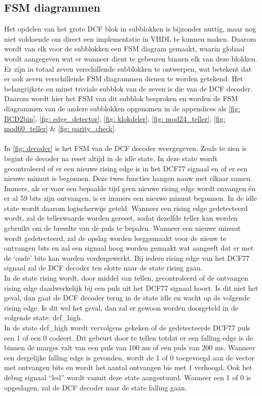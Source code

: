 \documentclass[a4paper, twoside, 10pt]{article}
\begin{document}
\subsection{FSM diagrammen}
Het opdelen van het grote DCF blok in subblokken is bijzonder nuttig, maar nog niet voldoende om direct een implementatie in VHDL te kunnen maken. Daarom wordt van elk voor de subblokken een FSM diagram gemaakt, waarin globaal wordt aangegeven wat er wanneer dient te gebeuren binnen elk van deze blokken. Er zijn in totaal zeven verschillende subblokken te ontwerpen, wat betekent dat er ook zeven verschillende FSM diagrammen dienen te worden getekend. Het belangrijkste en minst triviale subblok van de zeven is die van de DCF decoder. Daarom wordt hier het FSM van dit subblok besproken en worden de FSM diagrammen van de andere subblokken opgenomen in de appendices als \cref{fig: BCD2bin}, \cref{fig: edge_detector}, \cref{fig: klokdeler}, \cref{fig: mod24_teller}, \cref{fig: mod60_teller} \& \cref{fig: parity_check}.\\\\
\noindent In \cref{fig: decoder} is het FSM van de DCF decoder weergegeven. Zoals te zien is begint de decoder na reset altijd in de idle state. In deze state wordt gecontroleerd of er een nieuwe rising edge is in het DCF77 signaal en of er een nieuwe minuut is begonnen. Deze twee functies hangen nauw met elkaar samen. Immers, als er voor een bepaalde tijd geen nieuwe rising edge wordt onvangen \'en er al 59 bits zijn ontvangen, is er immers een nieuwe minuut begonnen. In de idle state wordt daarom logischerwijs geteld. Wanneer een rising edge gedetecteerd wordt, zal de tellerwaarde worden gereset, zodat dezelfde teller kan worden gebruikt om de breedte van de puls te bepalen. Wanneer een nieuwe minuut wordt gedetecteerd, zal de opslag worden leeggemaakt voor de nieuw te ontvangen bits en zal een signaal hoog worden gemaakt wat aangeeft dat er met de `oude' bits kan worden verdergewerkt. Bij iedere rising edge van het DCF77 signaal zal de DCF decoder ten slotte naar de state rising gaan.\\
\noindent In de state rising wordt, door middel van tellen, gecontroleerd of de ontvangen rising edge daadwerkelijk bij een puls uit het DCF77 signaal hoort. Is dit niet het geval, dan gaat de DCF decoder terug in de state idle en wacht op de volgende rising edge. Is dit wel het geval, dan zal er gewoon worden doorgeteld in de volgende state: dcf\_high.\\
\noindent In de state dcf\_high wordt vervolgens gekeken of de gedetecteerde DCF77 puls een 1 of een 0 codeert. Dit gebeurt door te tellen totdat er een falling edge is de binnen de marges valt van een puls van 100 ms of een puls van 200 ms. Wanneer een dergelijke falling edge is gevonden, wordt de 1 of 0 toegevoegd aan de vector met ontvangen bits en wordt het aantal ontvangen bis met 1 verhoogd. Ook het debug signaal ``led'' wordt vanuit deze state aangestuurd. Wanneer een 1 of 0 is opgeslagen, zal de DCF decoder naar de state falling gaan.\\\\
\end{document}
